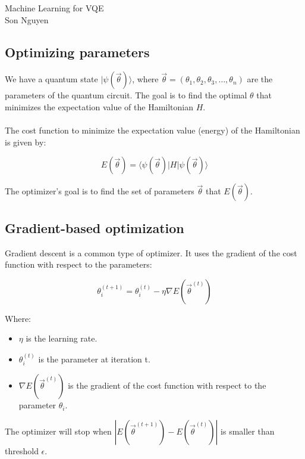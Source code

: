 \documentclass{article}
\begin{document}
\begin{center}
    \LARGE{Machine Learning for VQE}\\[1em]
    \large Son Nguyen\\[1em]
\end{center}

\onehalfspacing


\subsection*{Optimizing parameters}

We have a quantum state \(|\psi(\vec{\theta})\rangle\), where \(\vec{\theta} = (\theta_1, \theta_2, \theta_3, \dots, \theta_n)\) are the parameters of the quantum circuit. The goal is to find the optimal \(\theta\) that minimizes the expectation value of the Hamiltonian \(H\). \\
\\
The cost function to minimize the expectation value (energy) of the Hamiltonian is given by:

\[E (\vec{\theta}) = \langle \psi(\vec{\theta})|H|\psi(\vec{\theta})\rangle\]

\noindent The optimizer's goal is to find the set of parameters \(\vec{\theta}\) that \(E(\vec{\theta})\).

\subsection*{Gradient-based optimization}

Gradient descent is a common type of optimizer. It uses the gradient of the cost function with respect to the parameters:

\[\theta^{(t+1)}_i = \theta^{(t)}_i - \eta \nabla E(\vec{\theta}^{(t)})\]

\noindent Where:
\begin{itemize}
    \item \(\eta\) is the learning rate.
    \item \(\theta^{(t)}_i\) is the parameter at iteration t.
    \item \(\nabla E(\vec{\theta}^{(t)})\) is the gradient of the cost function with respect to the parameter \(\theta_i\).
\end{itemize}
The optimizer will stop when \(|E(\vec{\theta}^{(t+1)})- E(\vec{\theta}^{(t)})| \) is smaller than threshold \(\epsilon\).
\end{document}
